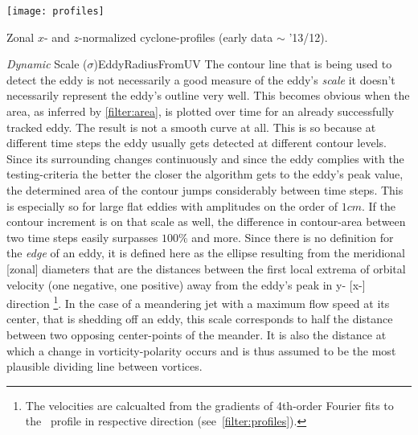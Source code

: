 \begin{marginfigure}
	\texttt{[image: profiles]}
	\caption{Zonal $x$- and $z$-normalized cyclone-profiles (early data $\sim$ '13/12).}
	\label{fig:profiles}
\end{marginfigure}
\begin{filter}{\textit{Dynamic} Scale ($\sigma$)}{EddyRadiusFromUV}
 \label{filter:dynscale}
The contour line that is being used to detect the eddy is not
necessarily a good measure of the eddy's \textit{scale} \ie it doesn't
necessarily represent the eddy's outline very well. This becomes
obvious when the area, as inferred by \cref{filter:area}, is plotted over time
for an already successfully tracked eddy. The result is not a smooth curve at
all. This is so because at different time steps the eddy usually gets detected
at different contour levels. Since its surrounding changes continuously and
since the eddy complies with the testing-criteria the better the closer the
algorithm gets to the eddy's peak value, the determined area of the contour
jumps considerably between time steps. This is especially so for large flat
eddies with amplitudes on the order of $1cm$. If the contour increment is on
that scale as well, the difference in contour-area between two time steps
easily surpasses $100\%$ and more.
Since there is no definition for the \textit{edge} of an eddy, it is defined here as the ellipse resulting from the meridional [zonal] diameters that
are the distances between the first local extrema of orbital velocity (one negative, one positive) away from
the eddy's peak in y- [x-] direction \footnote{The velocities are calcualted from the gradients of 4th-order Fourier fits to the \SSH~profile in respective direction (see~\cref{filter:profiles}).}.
In the case of a meandering jet with a maximum flow speed at its center, that
is shedding off an eddy, this scale corresponds to half the distance between
two opposing center-points of the meander. It is also the distance at which a
change in vorticity-polarity occurs and is thus assumed to be the most plausible
dividing line between vortices. \\

\end{filter}
